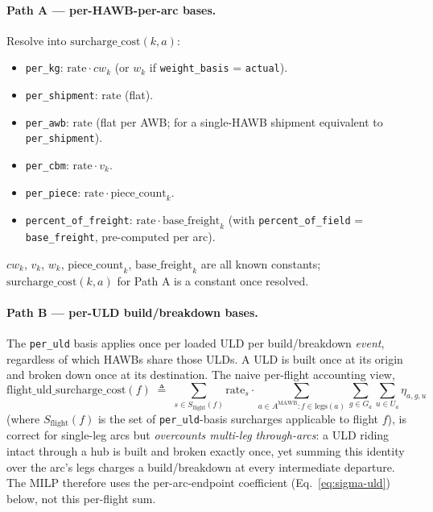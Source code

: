\documentclass[11pt,a4paper]{article}
\newcommand{\defeq}{\triangleq}
\theoremstyle{definition}
\begin{document}
\paragraph{Path A --- per-HAWB-per-arc bases.}
Resolve into $\text{surcharge\_cost}(k, a)$:
\begin{itemize}[noitemsep]
  \item \texttt{per\_kg}: $\text{rate} \cdot cw_k$ (or $w_k$ if
        \texttt{weight\_basis} = \texttt{actual}).
  \item \texttt{per\_shipment}: $\text{rate}$ (flat).
  \item \texttt{per\_awb}: $\text{rate}$ (flat per AWB; for a single-HAWB
        shipment equivalent to \texttt{per\_shipment}).
  \item \texttt{per\_cbm}: $\text{rate} \cdot v_k$.
  \item \texttt{per\_piece}: $\text{rate} \cdot \text{piece\_count}_k$.
  \item \texttt{percent\_of\_freight}: $\text{rate} \cdot
        \text{base\_freight}_k$ (with \texttt{percent\_of\_field} =
        \texttt{base\_freight}, pre-computed per arc).
\end{itemize}
$cw_k$, $v_k$, $w_k$, $\text{piece\_count}_k$, $\text{base\_freight}_k$ are
all known constants; $\text{surcharge\_cost}(k, a)$ for Path A is a constant
once resolved.

\paragraph{Path B --- per-ULD build/breakdown bases.}
The \texttt{per\_uld} basis applies once per loaded ULD per
build/breakdown \emph{event}, regardless of which HAWBs share those ULDs.
A ULD is built once at its origin and broken down once at its destination.
The naive per-flight accounting view,
\begin{equation}
  \text{flight\_uld\_surcharge\_cost}(f) \;\defeq\;
  \sum_{s \in S_{\text{flight}}(f)} \text{rate}_s
    \cdot \sum_{a \in A^{\text{MAWB}} : f \in \text{legs}(a)}
    \sum_{g \in G_a} \sum_{u \in U_a} \eta_{a,g,u}
  \label{eq:flight-uld-surcharge}
\end{equation}
(where $S_{\text{flight}}(f)$ is the set of \texttt{per\_uld}-basis surcharges
applicable to flight $f$), is correct for single-leg arcs but
\emph{overcounts multi-leg through-arcs}: a ULD riding intact through a hub
is built and broken exactly once, yet summing this identity over the arc's
legs charges a build/breakdown at every intermediate departure. The MILP
therefore uses the per-arc-endpoint coefficient (Eq.~\ref{eq:sigma-uld})
below, not this per-flight sum.
\end{document}
